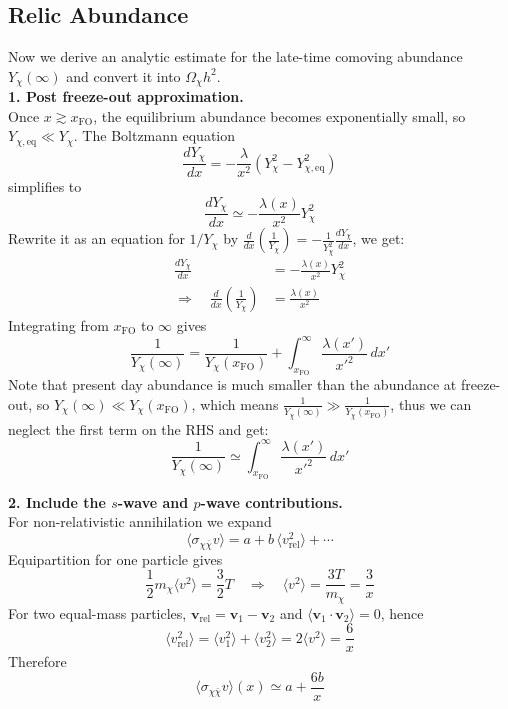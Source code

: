 \clearpage
\subsection{Relic Abundance}
\begin{foundation}

    Now we derive an analytic estimate for the late-time comoving abundance $Y_\chi(\infty)$ and convert it into $\Omega_\chi h^2$. \\

    \textbf{1. Post freeze-out approximation.}\\
    Once $x\gtrsim x_{\mathrm{FO}}$, the equilibrium abundance becomes exponentially small, so $Y_{\chi,\mathrm{eq}}\ll Y_\chi$. The Boltzmann equation
    \[
        \frac{dY_\chi}{dx} = -\frac{\lambda}{x^2}\left(Y_\chi^2-Y_{\chi,\mathrm{eq}}^2\right)
    \]
    simplifies to
    \[
        \frac{dY_\chi}{dx}\simeq -\frac{\lambda(x)}{x^2}Y_\chi^2
    \]
    Rewrite it as an equation for $1/Y_\chi$ by $\frac{d}{dx}\left(\frac{1}{Y_\chi}\right) = -\frac{1}{Y_\chi^2}\frac{dY_\chi}{dx}$, we get:
    \begin{align*}
        \frac{dY_\chi}{dx} &= -\frac{\lambda(x)}{x^2}Y_\chi^2 \\
        \Rightarrow\quad \frac{d}{dx}\left(\frac{1}{Y_\chi}\right) &= \frac{\lambda(x)}{x^2}
    \end{align*}
    Integrating from $x_{\mathrm{FO}}$ to $\infty$ gives
    \[
        \frac{1}{Y_\chi(\infty)} = \frac{1}{Y_\chi(x_{\mathrm{FO}})} + \int_{x_{\mathrm{FO}}}^{\infty}\frac{\lambda(x')}{x'^2}\,dx'
    \]
    Note that present day abundance is much smaller than the abundance at freeze-out, so $Y_\chi(\infty)\ll Y_\chi(x_{\mathrm{FO}})$, which means $\frac{1}{Y_\chi(\infty)}\gg \frac{1}{Y_\chi(x_{\mathrm{FO}})}$, thus we can neglect the first term on the RHS and get:
    \[
        \frac{1}{Y_\chi(\infty)}\simeq \int_{x_{\mathrm{FO}}}^{\infty}\frac{\lambda(x')}{x'^2}\,dx'
    \]

    \textbf{2. Include the $s$-wave and $p$-wave contributions.}\\
    For non-relativistic annihilation we expand
    \[
        \langle\sigma_{\chi\bar\chi}v\rangle = a + b\,\langle v_{\mathrm{rel}}^2\rangle + \cdots
    \]
    Equipartition for one particle gives
    \[
        \frac{1}{2}m_\chi\langle v^2\rangle = \frac{3}{2}T
        \quad\Rightarrow\quad
        \langle v^2\rangle = \frac{3T}{m_\chi} = \frac{3}{x}
    \]
    For two equal-mass particles, $\mathbf{v}_{\mathrm{rel}}=\mathbf{v}_1-\mathbf{v}_2$ and $\langle \mathbf{v}_1\cdot\mathbf{v}_2\rangle=0$, hence
    \[
        \langle v_{\mathrm{rel}}^2\rangle = \langle v_1^2\rangle + \langle v_2^2\rangle = 2\langle v^2\rangle = \frac{6}{x}
    \]
    Therefore
    \[
        \langle\sigma_{\chi\bar\chi}v\rangle(x)\simeq a + \frac{6b}{x}
    \]


\end{foundation}

